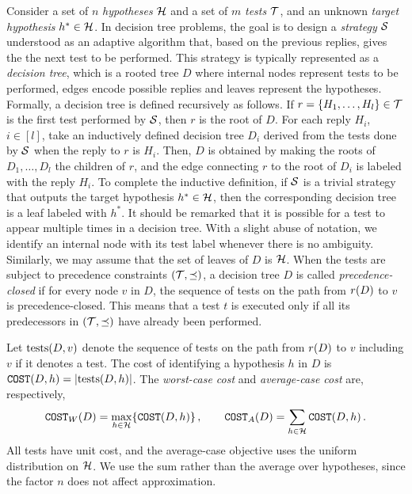 Consider a set of $n$ \emph{hypotheses} $\mathcal{H}$ and a set of $m$ \emph{tests} $\mathcal{T}$, and an unknown \emph{target hypothesis} $h^*\in\mathcal{H}$.
In decision tree problems, the goal is to design a \textit{strategy} $\mathcal{S}$ understood as an adaptive algorithm that, based on the previous replies, gives the \questioner the next test to be performed.
This strategy is typically represented as a \textit{decision tree}, which is a rooted tree $D$ where internal nodes represent tests to be performed, edges encode possible replies and leaves represent the hypotheses.
Formally, a decision tree is defined recursively as follows.
If $r=\mathopen{}\left\{ H_1,\ldots,H_l \right\}\in\mathcal{T}$ is the first test performed by $\mathcal{S}$, then $r$ is the root of $D$.
For each reply $H_i$, $i\in[l]$, take an inductively defined decision tree $D_i$ derived from the tests done by $\mathcal{S}$ when the reply to $r$ is $H_i$.
Then, $D$ is obtained by making the roots of $D_1,\ldots,D_l$ the children of $r$, and the edge connecting $r$ to the root of $D_i$ is labeled with the reply $H_i$.
To complete the inductive definition, if $\mathcal{S}$ is a trivial strategy that outputs the target hypothesis $h^*\in \mathcal{H}$, then the corresponding decision tree is a leaf labeled with $h^*$.
It should be remarked that it is possible for a test to appear multiple times in a decision tree.
With a slight abuse of notation, we identify an internal node with its test label whenever there is no ambiguity. Similarly, we may assume that the set of leaves of $D$ is $\mathcal{H}$. When the tests are subject to precedence constraints $(\mathcal{T}, \preceq)$, a decision tree $D$ is called \emph{precedence-closed} if for every node $v$ in $D$, the sequence of tests on the path from $r\mathopen{}\left( D \right)$ to $v$ is precedence-closed. This means that a test $t$ is executed only if all its predecessors in $(\mathcal{T}, \preceq)$ have already been performed.

Let $\operatorname{tests}(D,v)$ denote the sequence of tests on the path from $r\mathopen{}\left( D \right)$ to $v$ including $v$ if it denotes a test. The cost of identifying a hypothesis $h$ in $D$ is $\texttt{COST}\mathopen{}\left( D, h \right)=\mathopen{}\left| \operatorname{tests}(D,h) \right|$.
The \emph{worst-case cost} and \emph{average-case cost} are, respectively,
\[
\texttt{COST}_W\mathopen{}\left( D \right) = \max_{h \in \mathcal{H}} \mathopen{}\left\{ \texttt{COST}\mathopen{}\left( D, h \right) \right\},
\qquad \texttt{COST}_A\mathopen{}\left( D \right) = \sum_{h \in \mathcal{H}} \texttt{COST}\mathopen{}\left( D, h \right).
\]
All tests have unit cost, and the average-case objective uses the uniform distribution on $\mathcal{H}$. We use the sum rather than the average over hypotheses, since the factor $n$ does not affect approximation.

